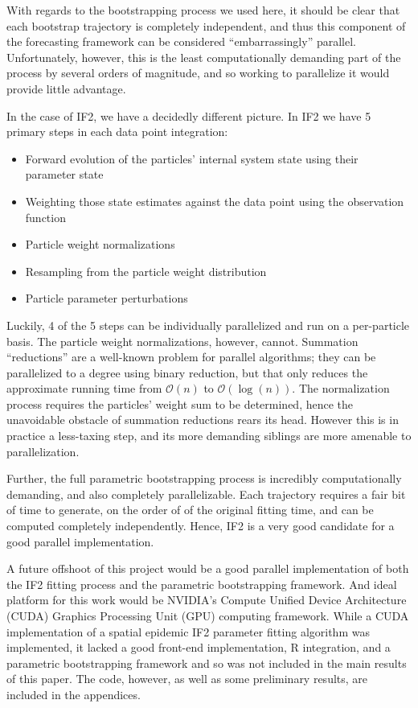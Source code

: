 	With regards to the bootstrapping process we used here, it should be clear that each bootstrap trajectory is completely independent, and thus this component of the forecasting framework can be considered ``embarrassingly'' parallel. Unfortunately, however, this is the least computationally demanding part of the process by several orders of magnitude, and so working to parallelize it would provide little advantage.

	In the case of IF2, we have a decidedly different picture. In IF2 we have 5 primary steps in each data point integration: 

	\begin{itemize}
		\item Forward evolution of the particles' internal system state using their parameter state
		\item Weighting those state estimates against the data point using the observation function
		\item Particle weight normalizations
		\item Resampling from the particle weight distribution
		\item Particle parameter perturbations
	\end{itemize}

	Luckily, 4 of the 5 steps can be individually parallelized and run on a per-particle basis. The particle weight normalizations, however, cannot. Summation ``reductions'' are a well-known problem for parallel algorithms; they can be parallelized to a degree using binary reduction, but that only reduces the approximate running time from $\mathcal{O}(n)$ to $\mathcal{O}(\log(n))$. The normalization process requires the particles' weight sum to be determined, hence the unavoidable obstacle of summation reductions rears its head. However this is in practice a less-taxing step, and its more demanding siblings are more amenable to parallelization.

	Further, the full parametric bootstrapping process is incredibly computationally demanding, and also completely parallelizable. Each trajectory requires a fair bit of time to generate, on the order of of the original fitting time, and can be computed completely independently. Hence, IF2 is a very good candidate for a good parallel implementation.

	A future offshoot of this project would be a good parallel implementation of both the IF2 fitting process and the parametric bootstrapping framework. And ideal platform for this work would be NVIDIA's Compute Unified Device Architecture (CUDA) Graphics Processing Unit (GPU) computing framework. While a CUDA implementation of a spatial epidemic IF2 parameter fitting algorithm was implemented, it lacked a good front-end implementation, R integration, and a parametric bootstrapping framework and so was not included in the main results of this paper. The code, however, as well as some preliminary results, are included in the appendices.

